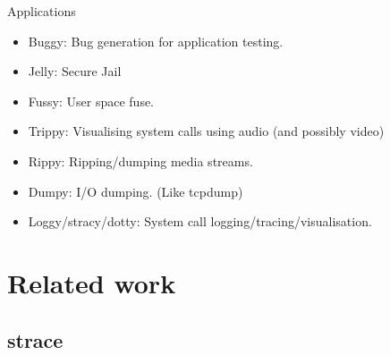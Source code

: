 \documentclass[a4paper, twoside, 10pt, twocolumn]{report}
\begin{document}
Applications
\begin{itemize}
    \item Buggy: Bug generation for application testing.
    \item Jelly: Secure Jail
    \item Fussy: User space fuse.
    \item Trippy: Visualising system calls using audio (and possibly video)
    \item Rippy: Ripping/dumping media streams.
    \item Dumpy: I/O dumping. (Like tcpdump)
    \item Loggy/stracy/dotty: System call logging/tracing/visualisation.
\end{itemize}


\chapter{Related work}

\section{strace}



\end{document}
